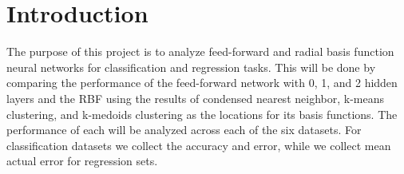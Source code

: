 

\section{Introduction}\label{sec:introduction} The purpose of this project is to analyze feed-forward and radial basis function neural networks for classification and regression tasks. This will be done by comparing the performance of the feed-forward network with 0, 1, and 2 hidden layers and the RBF using the results of condensed nearest neighbor, k-means clustering, and k-medoids clustering as the locations for its basis functions. The performance of each will be analyzed across each of the six datasets. For classification datasets we collect the accuracy and error, while we collect mean actual error for regression sets.


